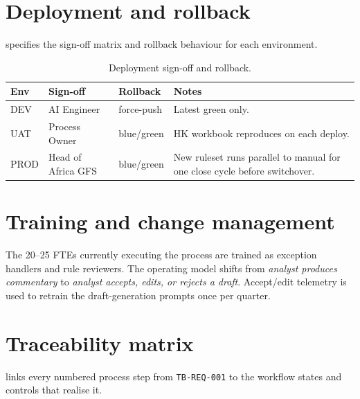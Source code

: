 \section{Deployment and rollback}

 specifies the sign-off matrix and rollback
behaviour for each environment.

\begin{table}[htbp]
\caption{Deployment sign-off and rollback.}\label{tab:deployment}
\centering
\footnotesize
\begin{tabularx}{\linewidth}{@{}lllX@{}}
\toprule
\textbf{Env} & \textbf{Sign-off} & \textbf{Rollback} & \textbf{Notes} \\ \midrule
DEV  & AI Engineer        & force-push   & Latest green only. \\
UAT  & Process Owner      & blue/green   & HK workbook reproduces on each deploy. \\
PROD & Head of Africa GFS & blue/green   & New ruleset runs parallel to manual for one close cycle before switchover. \\
\bottomrule
\end{tabularx}
\end{table}

\section{Training and change management}

The 20--25 FTEs currently executing the process are trained as
exception handlers and rule reviewers. The operating model shifts
from \emph{analyst produces commentary} to \emph{analyst accepts,
edits, or rejects a draft}. Accept/edit telemetry is used to retrain
the draft-generation prompts once per quarter.

\section{Traceability matrix}

 links every numbered process step from
\texttt{TB-REQ-001} to the workflow states and controls that realise
it.

